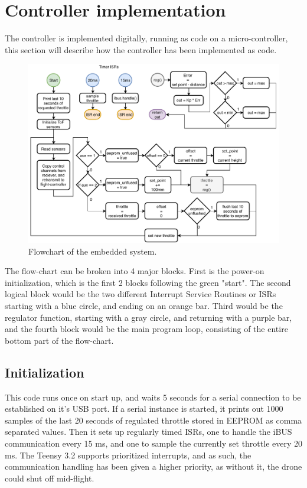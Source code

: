 \section{Controller implementation}\label{sec:control_code}
The controller is implemented digitally, running as code on a micro-controller, this section will describe how the controller has been implemented as code.

\begin{figure}[H]
    \centering
    \includegraphics[width=1\textwidth]{figures/ch_design/controller/EIT5-code.pdf}
    \caption{Flowchart of the embedded system.}
    \label{fig:code_flowchart}
\end{figure}

The flow-chart can be broken into 4 major blocks. First is the power-on initialization, which is the first 2 blocks following the green "start". The second logical block would be the two different Interrupt Service Routines or ISRs starting with a blue circle, and ending on an orange bar. Third would be the regulator function, starting with a gray circle, and returning with a purple bar, and the fourth block would be the main program loop, consisting of the entire bottom part of the flow-chart.

\subsection*{Initialization}
This code runs once on start up, and waits 5 seconds for a serial connection to be established on it's USB port. If a serial instance is started, it prints out 1000 samples of the last 20 seconds of regulated throttle stored in EEPROM as comma separated values.
Then it sets up regularly timed ISRs, one to handle the iBUS communication every 15 ms, and one to sample the currently set throttle every 20 ms.
The Teensy 3.2 supports prioritized interrupts, and as such, the communication handling has been given a higher priority, as without it, the drone could shut off mid-flight.

